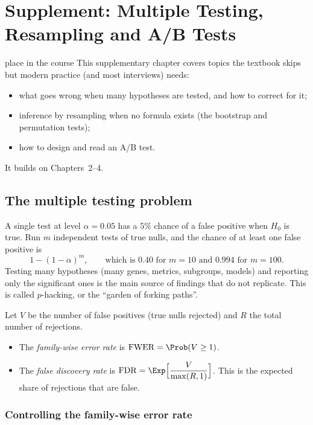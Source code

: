 \chapter{Supplement: Multiple Testing, Resampling and A/B Tests}

\begin{nuance}{place in the course}
This supplementary chapter covers topics the textbook skips but modern practice (and most interviews) needs:
\begin{itemize}
  \item what goes wrong when many hypotheses are tested, and how to correct for it;
  \item inference by resampling when no formula exists (the bootstrap and permutation tests);
  \item how to design and read an A/B test.
\end{itemize}
It builds on Chapters~2--4.
\end{nuance}

\section{The multiple testing problem}

A single test at level $\alpha=0.05$ has a $5\%$ chance of a false positive when $H_0$ is true. Run $m$ independent tests of true nulls, and the chance of at least one false positive is
\[ 1-(1-\alpha)^m,\qquad\text{which is }0.40\text{ for }m=10\text{ and }0.994\text{ for }m=100. \]
Testing many hypotheses (many genes, metrics, subgroups, models) and reporting only the significant ones is the main source of findings that do not replicate. This is called $p$-hacking, or the ``garden of forking paths''.

\begin{definition}
Let $V$ be the number of false positives (true nulls rejected) and $R$ the total number of rejections.
\begin{itemize}
  \item The \emph{family-wise error rate} is $\mathrm{FWER}=\Prob(V\ge1)$.
  \item The \emph{false discovery rate} is $\mathrm{FDR}=\Exp\Big[\dfrac V{\max(R,1)}\Big]$. This is the expected share of rejections that are false.
\end{itemize}
\end{definition}

\subsection{Controlling the family-wise error rate}

